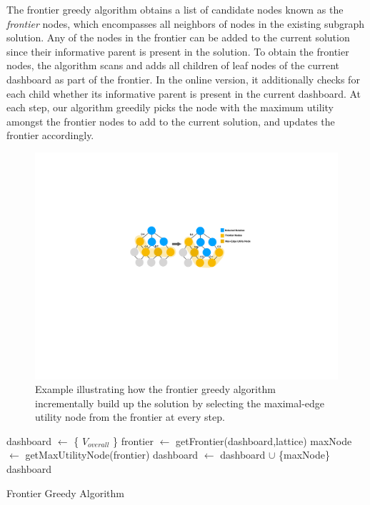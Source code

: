 \par The frontier greedy algorithm obtains a list of candidate nodes known as the \textit{frontier} nodes, which encompasses all neighbors of nodes in the existing subgraph solution. Any of the nodes in the frontier can be added to the current solution since their informative parent is present in the solution. To obtain the frontier nodes, the algorithm scans and adds all children of leaf nodes of the current dashboard as part of the frontier. In the online version, it additionally checks for each child whether its informative parent is present in the current dashboard. At each step, our algorithm greedily picks the node with the maximum utility amongst the frontier nodes to add to the current solution, and updates the frontier accordingly. 
\begin{figure}[h!]
\centering
\includegraphics[width=\linewidth]{figures/frontier_greedy.pdf}
\caption{Example illustrating how the frontier greedy algorithm incrementally build up the solution by selecting the maximal-edge utility node from the frontier at every step.}
\end{figure}
\begin{algorithm}
  \begin{algorithmic}[1]
  \State dashboard $\gets$ \{ $V_{overall}$ \}
      \State frontier $\gets$ getFrontier(dashboard,lattice)
      \State maxNode $\gets$ getMaxUtilityNode(frontier)
      \State dashboard $\gets$ dashboard $\cup$ \{maxNode\}
  \EndWhile
  \Return dashboard
  \EndProcedure
  \end{algorithmic}
  \caption{Frontier Greedy Algorithm}\label{algo:frontier_greedy}
\end{algorithm}

